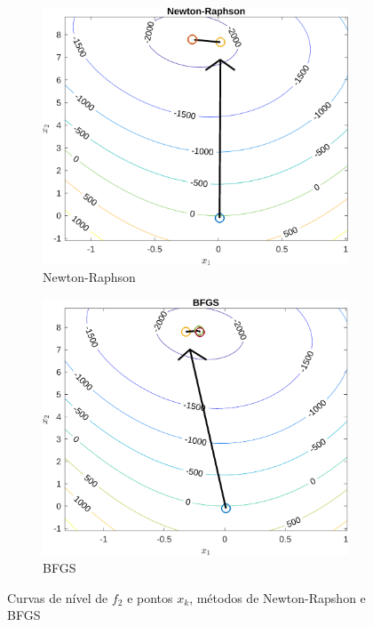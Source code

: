 \documentclass[10pt, a4paper]{article}
\begin{document}
\begin{figure}[H]
      \centering
      \begin{subfigure}{0.45\textwidth}
            \centering
            \includegraphics[width=\textwidth]{img02_m05.png}
            \caption{Newton-Raphson}
            \label{fig:graf02_m05}
      \end{subfigure}
      \begin{subfigure}{0.45\textwidth}
            \centering
            \includegraphics[width=\textwidth]{img02_m06.png}
            \caption{BFGS}
            \label{fig:graf02_m06}
      \end{subfigure}
      \caption{Curvas de n\'ivel de $f_{2}$ e pontos $x_{k}$, m\'etodos de Newton-Rapshon e BFGS}
      \label{fig:graf02_ordem2}
\end{figure}
\end{document}
